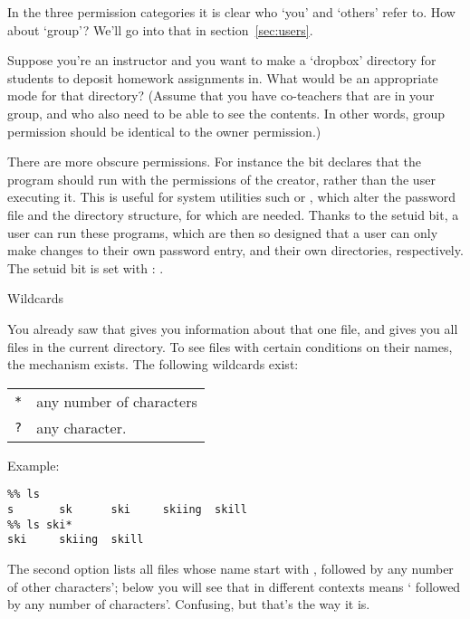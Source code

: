 In the three permission categories it is clear who `you' and `others'
refer to. How about `group'? We'll go into that in section~\ref{sec:users}.

\begin{exercise}
  Suppose you're an instructor and you want to make a `dropbox'
  directory for students to deposit homework assignments in.
  What would be an appropriate mode for that directory?
  (Assume that you have co-teachers that are in your group,
  and who also need to be able to see the contents. In other words,
  group permission should be identical to the owner permission.)
\end{exercise}


\begin{remark}
  There are more obscure permissions. For instance the
   bit declares that the program should run with the
  permissions of the creator, rather than the user executing it. This
  is useful for system utilities such  or , which
  alter the password file and the directory structure, for which
   are needed. Thanks to the setuid
  bit, a user can run these programs, which are then so designed that
  a user can only make changes to their own password entry, and their
  own directories, respectively. The setuid bit is set with
  : .
\end{remark}

 {Wildcards}
\label{sec:shell-wildcard}

You already saw that  gives you information about that
one file, and  gives you all files in the current directory. To
see files with certain conditions on their names, the
 mechanism exists. The following wildcards exist:

\begin{tabular}{ll}
  \toprule
  \verb+*+& any number of characters\\
  \verb+?+& any character.\\
  \bottomrule
\end{tabular}

Example:
\begin{verbatim}
%% ls
s       sk      ski     skiing  skill
%% ls ski*
ski     skiing  skill
\end{verbatim}
The second option lists all files whose name start with
, followed by any number of other characters'; below you will
see that in different contexts  means ` followed by any
number of  characters'. Confusing, but that's the way it is.

